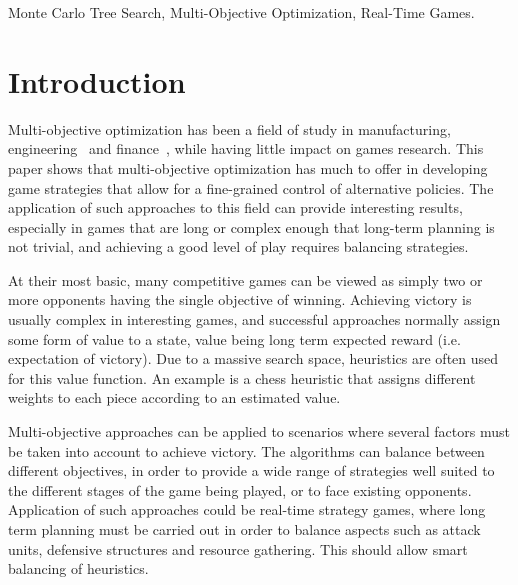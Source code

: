 \documentclass[journal]{IEEEtran}
\begin{document}
\begin{IEEEkeywords}
Monte Carlo Tree Search, Multi-Objective Optimization, Real-Time Games.
\end{IEEEkeywords}

%
\IEEEpeerreviewmaketitle


%


\section{Introduction} \label{sec:intro}

Multi-objective optimization has been a field of study in manufacturing, engineering~\cite{Marler2004} and finance~\cite{Coello2006}, while having little impact on games research. This paper shows that multi-objective optimization has much to offer in developing game strategies that allow for a fine-grained control of alternative policies. The application of such approaches to this field can provide interesting results, especially in games that are long or complex enough that long-term planning is not trivial, and achieving a good level of play requires balancing strategies.

At their most basic, many competitive games can be viewed as simply two or more opponents having the single objective of winning. Achieving victory is usually complex in interesting games, and successful approaches normally assign some form of value to a state, value being long term expected reward (i.e. expectation of victory). Due to a massive search space, heuristics are often used for this value function. An example is a chess heuristic that assigns different weights to each piece according to an estimated value.

Multi-objective approaches can be applied to scenarios where several factors must be taken into account to achieve victory. The algorithms can balance between different objectives, in order to provide a wide range of strategies well suited to the different stages of the game being played, or to face existing opponents. Application of such approaches could be real-time strategy games, where long term planning must be carried out in order to balance aspects such as attack units, defensive structures and resource gathering. This should allow smart balancing of heuristics. 
\end{document}
